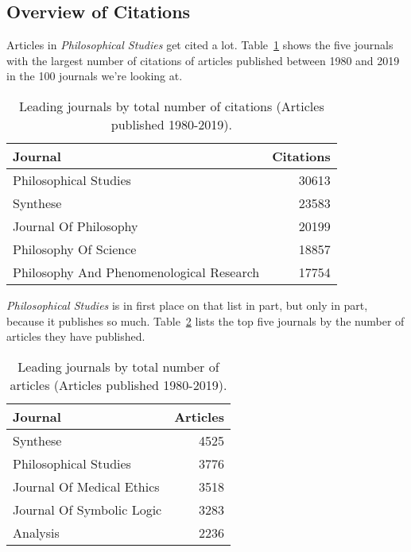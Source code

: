 \documentclass[
  10pt,
  letterpaper,
  DIV=11,
  numbers=noendperiod,
  twoside]{scrartcl}
\begin{document}
\subsection{Overview of Citations}\label{sec-citations-overview}

Articles in \emph{Philosophical Studies} get cited a lot.
Table~\ref{tbl-all-cites} shows the five journals with the largest
number of citations of articles published between 1980 and 2019 in the
100 journals we're looking at.

\begin{longtable}[]{@{}lr@{}}

\caption{\label{tbl-all-cites}Leading journals by total number of
citations (Articles published 1980-2019).}

\tabularnewline

\toprule\noalign{}
Journal & Citations \\
\midrule\noalign{}
\endhead
\bottomrule\noalign{}
\endlastfoot
Philosophical Studies & 30613 \\
Synthese & 23583 \\
Journal Of Philosophy & 20199 \\
Philosophy Of Science & 18857 \\
Philosophy And Phenomenological Research & 17754 \\

\end{longtable}

\emph{Philosophical Studies} is in first place on that list in part, but
only in part, because it publishes so much. Table~\ref{tbl-all-articles}
lists the top five journals by the number of articles they have
published.

\begin{longtable}[]{@{}lr@{}}

\caption{\label{tbl-all-articles}Leading journals by total number of
articles (Articles published 1980-2019).}

\tabularnewline

\toprule\noalign{}
Journal & Articles \\
\midrule\noalign{}
\endhead
\bottomrule\noalign{}
\endlastfoot
Synthese & 4525 \\
Philosophical Studies & 3776 \\
Journal Of Medical Ethics & 3518 \\
Journal Of Symbolic Logic & 3283 \\
Analysis & 2236 \\

\end{longtable}
\end{document}
